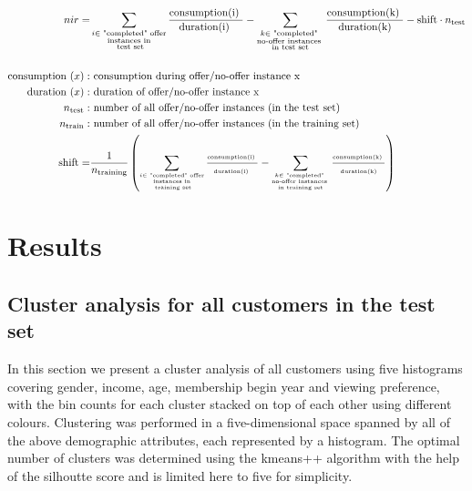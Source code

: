 \documentclass[11pt]{article} %
\begin{document}
\begin{align}
nir=& \sum_{\substack{i \in \text{ "completed" offer}\\ \text{instances in}\\ \text{ test set}}} \frac{ \text{consumption(i) }}{ \text{duration(i) }} -   \sum_{\substack{k \in \text{ "completed" } \\ \text{no-offer instances  }\\ \text{in test set}}} \frac{  \text{consumption(k) }}{ \text{ duration(k) }}-\text{shift}\cdot  n_{\text{test}}
\\
\nonumber\\
 \text{consumption }(x):& \text{\ consumption during offer/no-offer instance x}\nonumber\\ 
 \text{duration }(x):& \text{\ duration of offer/no-offer instance x}\nonumber\\ 
 n_{\text{test}}:& \text{\ number of all offer/no-offer instances (in the test set)}\nonumber\\ 
 n_{\text{train}}:& \text{\ number of all offer/no-offer instances (in the training set)}\nonumber\\ 
 \text{shift}=& {\tiny   \frac{1}{ n_{\text{training}}}   \left(
 \sum_{\substack{i \in \text{ "completed" offer}\\ \text{instances in}\\ \text{ training set}}} \frac{ \text{consumption(i) }}{ \text{duration(i) }} -   \sum_{\substack{k \in \text{ "completed" } \\ \text{no-offer instances  }\\ \text{in training set}}} \frac{  \text{consumption(k) }}{ \text{ duration(k) }}  \right)    }\nonumber
\end{align}




\section{Results}



\subsection{Cluster analysis for all customers in the test set}
In this section we present a cluster analysis of all customers using five histograms covering gender, income, age, membership begin year and viewing preference, with the bin counts for each cluster stacked on top of each other using different colours. Clustering was performed in a five-dimensional space spanned by all of the above demographic attributes, each represented by a histogram.
The optimal number of clusters was determined using the kmeans++ algorithm with the help of the silhoutte score and is limited here to five for simplicity.
\end{document}
